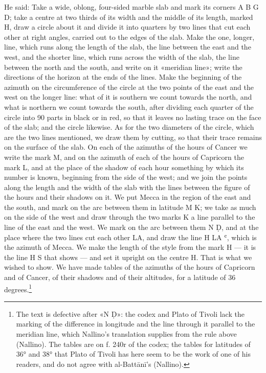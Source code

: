 \documentclass[11pt]{article}
\newcommand{\ArPage}[1]{\marginpar{\footnotesize\color{gray}Ar.\,p.\,#1}}
\begin{document}
\par \ArPage{208}He said: Take a wide, oblong, four-sided marble slab and mark its corners A B G D; take a centre at two thirds of its width and the middle of its length, marked H, draw a circle about it and divide it into quarters by two lines that cut each other at right angles, carried out to the edges of the slab. Make the one, longer, line, which runs along the length of the slab, the line between the east and the west, and the shorter line, which runs across the width of the slab, the line between the north and the south, and write on it «meridian line»; write the directions of the horizon at the ends of the lines. Make the beginning of the azimuth on the circumference of the circle at the two points of the east and the west on the longer line: what of it is southern we count towards the north, and what is northern we count towards the south, after dividing each quarter of the circle into 90 parts in black or in red, so that it leaves no lasting trace on the face of the slab; and the circle likewise. As for the two diameters of the circle, which are the two lines mentioned, we draw them by cutting, so that their trace remains on the surface of the slab. On each of the azimuths of the hours of Cancer we write the mark M, and on the azimuth of each of the hours of Capricorn the mark L, and at the place of the shadow of each hour something by which its number is known, beginning from the side of the west; and we join the points along the length and the width of the slab with the lines between the figure of the hours and their shadows on it. We put Mecca in the region of the east and the south, and mark on the arc between them in latitude M K; we take as much on the side of the west and draw through the two marks K a line parallel to the line of the east and the west. We mark on the arc between them N Ḍ, and at the place where the two lines cut each other LA, and draw the line H LA ʿ, which is the azimuth of Mecca. We make the length of the style from the mark H — it is the line H S that shows — and set it upright on the centre H. That is what we wished to show. We have made tables of the azimuths of the hours of Capricorn and of Cancer, of their shadows and of their altitudes, for a latitude of 36 degrees.\footnote{The text is defective after «N Ḍ»: the codex and Plato of Tivoli lack the marking of the difference in longitude and the line through it parallel to the meridian line, which Nallino's translation supplies from the rule above (Nallino). The tables are on f. 240r of the codex; the tables for latitudes of 36° and 38° that Plato of Tivoli has here seem to be the work of one of his readers, and do not agree with al-Battānī's (Nallino).}\par
\end{document}
